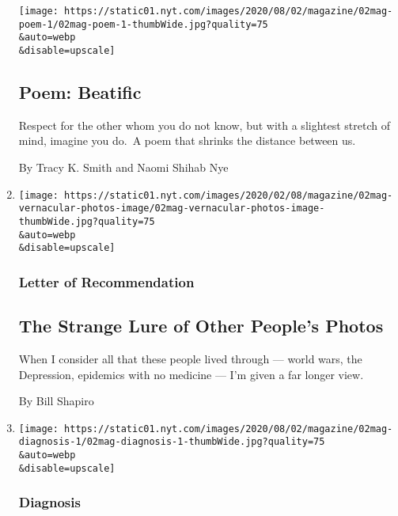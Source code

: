 \begin{enumerate}
  \texttt{[image: https://static01.nyt.com/images/2020/08/02/magazine/02mag-poem-1/02mag-poem-1-thumbWide.jpg?quality=75\\\&auto=webp\\\&disable=upscale]}

  \hypertarget{poem-beatific}{%
  \subsection{Poem: Beatific}\label{poem-beatific}}

  Respect for the other whom you do not know, but with a slightest
  stretch of mind, imagine you do.~A poem that shrinks the distance
  between us.

  By Tracy K. Smith and Naomi Shihab Nye
\item
  \href{/2020/07/30/magazine/the-strange-lure-of-other-peoples-photos.html}{}

  \texttt{[image: https://static01.nyt.com/images/2020/02/08/magazine/02mag-vernacular-photos-image/02mag-vernacular-photos-image-thumbWide.jpg?quality=75\\\&auto=webp\\\&disable=upscale]}

  \hypertarget{letter-of-recommendation}{%
  \subsubsection{Letter of
  Recommendation}\label{letter-of-recommendation}}

  \hypertarget{the-strange-lure-of-other-peoples-photos}{%
  \subsection{The Strange Lure of Other People's
  Photos}\label{the-strange-lure-of-other-peoples-photos}}

  When I consider all that these people lived through --- world wars,
  the Depression, epidemics with no medicine --- I'm given a far longer
  view.

  By Bill Shapiro
\item
  \href{/2020/07/30/magazine/urticaria-multiforme.html}{}

  \texttt{[image: https://static01.nyt.com/images/2020/08/02/magazine/02mag-diagnosis-1/02mag-diagnosis-1-thumbWide.jpg?quality=75\\\&auto=webp\\\&disable=upscale]}

  \hypertarget{diagnosis}{%
  \subsubsection{Diagnosis}\label{diagnosis}}


\end{enumerate}
